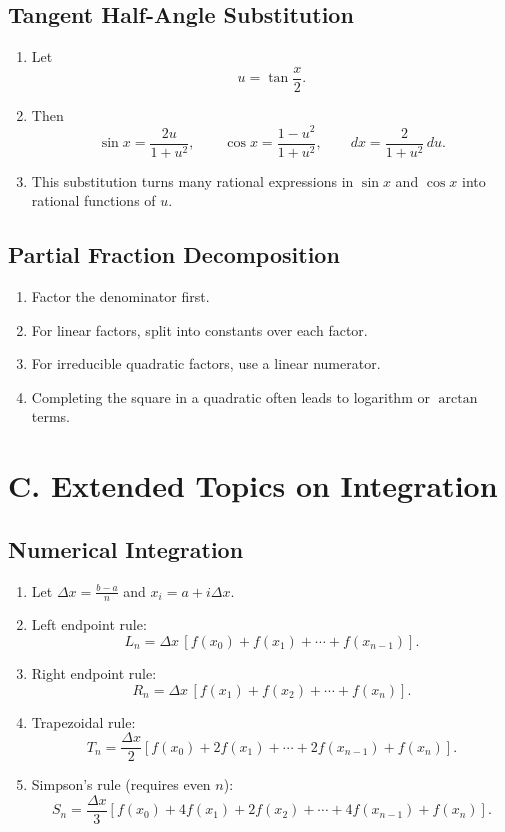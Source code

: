 \documentclass[11pt]{article}
\begin{document}
\subsection{Tangent Half-Angle Substitution}
\begin{enumerate}
  \item Let
  \[
  u=\tan\frac{x}{2}.
  \]
  \item Then
  \[
  \sin x=\frac{2u}{1+u^2},\qquad
  \cos x=\frac{1-u^2}{1+u^2},\qquad
  dx=\frac{2}{1+u^2}\,du.
  \]
  \item This substitution turns many rational expressions in $\sin x$ and $\cos x$ into rational functions of $u$.
\end{enumerate}

\subsection{Partial Fraction Decomposition}
\begin{enumerate}
  \item Factor the denominator first.
  \item For linear factors, split into constants over each factor.
  \item For irreducible quadratic factors, use a linear numerator.
  \item Completing the square in a quadratic often leads to logarithm or $\arctan$ terms.
\end{enumerate}

\section{C. Extended Topics on Integration}

\subsection{Numerical Integration}
\begin{enumerate}
  \item Let $\Delta x=\frac{b-a}{n}$ and $x_i=a+i\Delta x$.
  \item Left endpoint rule:
  \[
  L_n=\Delta x\,[f(x_0)+f(x_1)+\cdots+f(x_{n-1})].
  \]
  \item Right endpoint rule:
  \[
  R_n=\Delta x\,[f(x_1)+f(x_2)+\cdots+f(x_n)].
  \]
  \item Trapezoidal rule:
  \[
  T_n=\frac{\Delta x}{2}[f(x_0)+2f(x_1)+\cdots+2f(x_{n-1})+f(x_n)].
  \]
  \item Simpson's rule (requires even $n$):
  \[
  S_n=\frac{\Delta x}{3}[f(x_0)+4f(x_1)+2f(x_2)+\cdots+4f(x_{n-1})+f(x_n)].
  \]
\end{enumerate}
\end{document}
